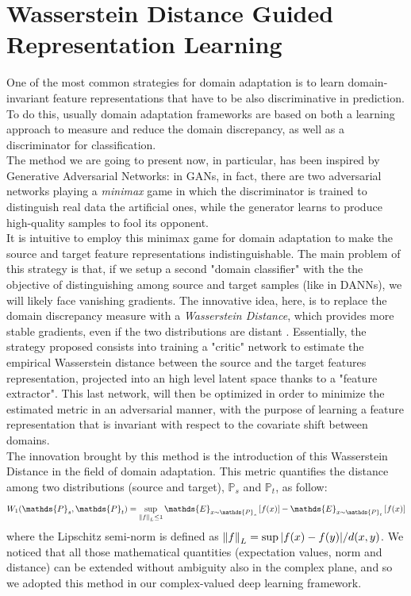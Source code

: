 \documentclass[../main.tex]{subfiles}
\begin{document}
\section{Wasserstein Distance Guided Representation Learning}

One of the most common strategies for domain adaptation is to learn domain-invariant feature representations that have to be also discriminative in prediction. To do this, usually domain adaptation frameworks are based on both a learning approach to measure and reduce the domain discrepancy, as well as a discriminator for classification.\\
The method we are going to present now, in particular, has been inspired by Generative Adversarial Networks: in GANs, in fact, there are two adversarial networks playing a \textit{minimax} game in which the discriminator is trained to distinguish real
data the artificial ones, while the generator learns to produce high-quality samples to fool its opponent.\\ 
It is intuitive to employ this minimax game for domain adaptation to make the source and target feature representations indistinguishable. The main problem of this strategy is that, if we setup a second "domain classifier" with the the objective of distinguishing among source and target samples (like in DANNs), we will likely face vanishing gradients. The innovative idea, here, is to replace the domain discrepancy measure with a \textit{Wasserstein Distance}, which provides more stable gradients, even if the two distributions are distant \cite{shen2018wasserstein}. Essentially, the strategy proposed consists into training a "critic" network to estimate the empirical Wasserstein distance between the source and the target features representation, projected into an high level latent space thanks to a "feature extractor". This last network, will then be optimized in order to minimize the estimated metric in an adversarial manner, with the purpose of learning a feature representation that is invariant with respect to the covariate shift between domains.\\
The innovation brought by this method is the introduction of this Wasserstein Distance in the field of domain adaptation. This metric quantifies the distance among two distributions (source and target), $\mathds{P}_s$ and $\mathds{P}_t$, as follow:
\[ W_1(\mathds{P}_s, \mathds{P}_t) = \sup_{\norm{f}_L\leq 1} \mathds{E}_{x\sim\mathds{P}_s}\left[f(x)\right] - \mathds{E}_{x\sim\mathds{P}_t}\left[f(x)\right] \]
where the Lipschitz semi-norm is defined as $\norm{f}_L = \sup\abs{f(x)-f(y)}/d(x,y)$. We noticed that all those mathematical quantities (expectation values, norm and distance) can be extended without ambiguity also in the complex plane, and so we adopted this method in our complex-valued deep learning framework.\\
\end{document}
